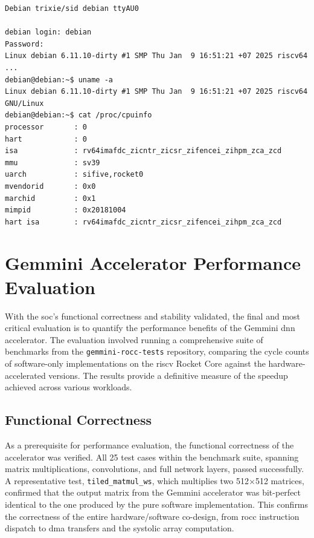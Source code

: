 \begin{lstlisting}[style=terminalstyle, caption={Demonstration of a functional \acrshort{debian} \acrshort{linux} environment on the implemented \acrshort{soc}.}, label={lst:linux_env}]
Debian trixie/sid debian ttyAU0

debian login: debian
Password:
Linux debian 6.11.10-dirty #1 SMP Thu Jan  9 16:51:21 +07 2025 riscv64
...
debian@debian:~$ uname -a
Linux debian 6.11.10-dirty #1 SMP Thu Jan  9 16:51:21 +07 2025 riscv64 GNU/Linux
debian@debian:~$ cat /proc/cpuinfo
processor       : 0
hart            : 0
isa             : rv64imafdc_zicntr_zicsr_zifencei_zihpm_zca_zcd
mmu             : sv39
uarch           : sifive,rocket0
mvendorid       : 0x0
marchid         : 0x1
mimpid          : 0x20181004
hart isa        : rv64imafdc_zicntr_zicsr_zifencei_zihpm_zca_zcd
\end{lstlisting}


\FloatBarrier

\section{Gemmini Accelerator Performance Evaluation}
\label{sec:gemmini_results}

With the \acrshort{soc}'s functional correctness and stability validated, the final and most critical evaluation is to quantify the performance benefits of the Gemmini \acrshort{dnn} accelerator. The evaluation involved running a comprehensive suite of benchmarks from the \texttt{gemmini-rocc-tests} repository, comparing the cycle counts of software-only implementations on the \acrshort{riscv} Rocket Core against the hardware-accelerated versions. The results provide a definitive measure of the speedup achieved across various workloads.

\subsection{Functional Correctness}

As a prerequisite for performance evaluation, the functional correctness of the accelerator was verified. All 25 test cases within the benchmark suite, spanning matrix multiplications, convolutions, and full network layers, passed successfully. A representative test, \texttt{tiled\_matmul\_ws}, which multiplies two 512$\times$512 matrices, confirmed that the output matrix from the Gemmini accelerator was bit-perfect identical to the one produced by the pure software implementation. This confirms the correctness of the entire hardware/software co-design, from \acrshort{rocc} instruction dispatch to \acrshort{dma} transfers and the systolic array computation.


